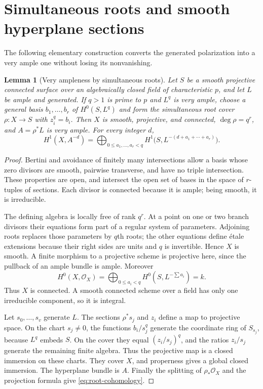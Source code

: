 \documentclass[11pt,a4paper]{article}
\newcommand{\OO}{\mathcal O}
\newtheorem{lemma}[theorem]{Lemma}
\theoremstyle{definition}\newtheorem{definition}[theorem]{Definition}
\theoremstyle{remark}\newtheorem{remark}[theorem]{Remark}
\numberwithin{equation}{section}
\begin{document}
\section{Simultaneous roots and smooth hyperplane sections}\label{sec:roots}

The following elementary construction converts the generated polarization into a very ample one without losing its nonvanishing.

\begin{lemma}[Very ampleness by simultaneous roots]\label{lem:roots}
Let $S$ be a smooth projective connected surface over an algebraically closed field of characteristic $p$, and let $L$ be ample and generated. If $q>1$ is prime to $p$ and $L^q$ is very ample, choose a general basis $b_1,\ldots,b_r$ of $H^0(S,L^q)$ and form the simultaneous root cover $\rho:X\to S$ with $z_i^q=b_i$. Then $X$ is smooth, projective, and connected, $\deg\rho=q^r$, and $A=\rho^*L$ is very ample. For every integer $d$,
\begin{equation}\label{eq:root-cohomology}
 H^1(X,A^{-d})=
 \bigoplus_{0\le a_1,\ldots,a_r<q}
 H^1\bigl(S,L^{-(d+a_1+\cdots+a_r)}\bigr).
\end{equation}
\end{lemma}
\begin{proof}
Bertini and avoidance of finitely many intersections allow a basis whose zero divisors are smooth, pairwise transverse, and have no triple intersection. These properties are open, and intersect the open set of bases in the space of $r$-tuples of sections. Each divisor is connected because it is ample; being smooth, it is irreducible.

The defining algebra is locally free of rank $q^r$. At a point on one or two branch divisors their equations form part of a regular system of parameters. Adjoining roots replaces those parameters by $q$th roots; the other equations define étale extensions because their right sides are units and $q$ is invertible. Hence $X$ is smooth. A finite morphism to a projective scheme is projective here, since the pullback of an ample bundle is ample. Moreover
\[
 H^0(X,\OO_X)=\bigoplus_{0\le a_i<q}H^0(S,L^{-\sum a_i})=k.
\]
Thus $X$ is connected. A smooth connected scheme over a field has only one irreducible component, so it is integral.

Let $s_0,\ldots,s_v$ generate $L$. The sections $\rho^*s_j$ and $z_i$ define a map to projective space. On the chart $s_j\ne0$, the functions $b_i/s_j^q$ generate the coordinate ring of $S_{s_j}$, because $L^q$ embeds $S$. On the cover they equal $(z_i/s_j)^q$, and the ratios $z_i/s_j$ generate the remaining finite algebra. Thus the projective map is a closed immersion on these charts. They cover $X$, and properness gives a global closed immersion. The hyperplane bundle is $A$. Finally the splitting of $\rho_*\OO_X$ and the projection formula give \eqref{eq:root-cohomology}.
\end{proof}
\end{document}
